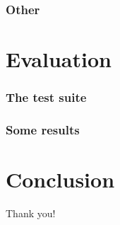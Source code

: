\documentclass[smaller,dvipsnames]{beamer}
\begin{document}
  \begin{frame}
    \frametitle{Other}
  \end{frame}

  \section{Evaluation}

  \begin{frame}
    \frametitle{The test suite}
  \end{frame}

  \begin{frame}
    \frametitle{Some results}
  \end{frame}

  \section{Conclusion}


  \begin{frame}[standout]
    Thank you!
  \end{frame}
\end{document}
